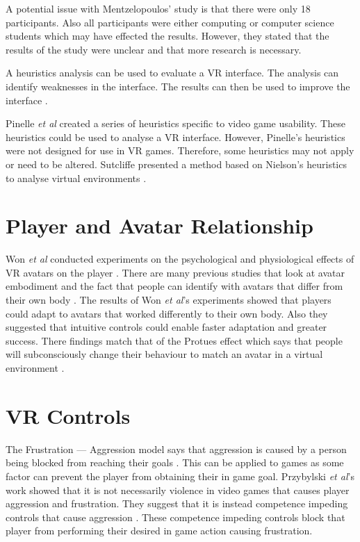 \documentclass{scrartcl}
\begin{document}
\bigskip  

A potential issue with Mentzelopoulos' study is that there were only 18 participants. Also all participants were either computing or computer science students which may have effected the results\cite{Mentzelopoulos}. However, they stated that the results of the study were unclear and that more research is necessary.

\bigskip 
 
A heuristics analysis can be used to evaluate a VR interface.  The analysis can identify weaknesses in the interface. The results can then be used to improve the interface \cite{Nielsen, Pinelle}.


Pinelle \textit{et al} created a series of heuristics specific to video game usability. These heuristics could be used to analyse a VR interface. However, Pinelle's heuristics were not designed for use in VR games.  Therefore, some heuristics may not apply or need to be altered.  Sutcliffe presented a method based on Nielson's heuristics to analyse virtual environments \cite{sutcliffe2004heuristic}.

\section{Player and Avatar Relationship}

Won \textit{et al} conducted experiments on the psychological and physiological effects of  VR avatars on the player \cite{won2015homuncular}. 
There are many previous studies that look at avatar embodiment and the fact that people can identify with avatars that differ from their own body \cite{Groen, Latoschik}.
The results of Won \textit{et al}'s experiments showed that players could adapt to avatars that worked differently to their own body. Also they suggested that intuitive controls could enable faster adaptation and greater success. There findings match that of the Protues effect which says that people will subconsciously change their behaviour to match an avatar in a virtual environment \cite{won2015homuncular, yee2007proteus}.


\section{VR Controls}
The Frustration --- Aggression model says that aggression is caused by a person being blocked from reaching their goals \cite{dollard1939frustration}.  This can be applied to games as some factor can prevent the player from obtaining their in game goal.  Przybylski \textit{et al}'s work showed that it is not necessarily violence in video games that causes player aggression and frustration. They suggest that it is instead competence impeding controls that cause aggression \cite{przybylski, przybylski2010motivational}. These competence impeding controls block that player from performing their desired in game action causing frustration. 
\end{document}
